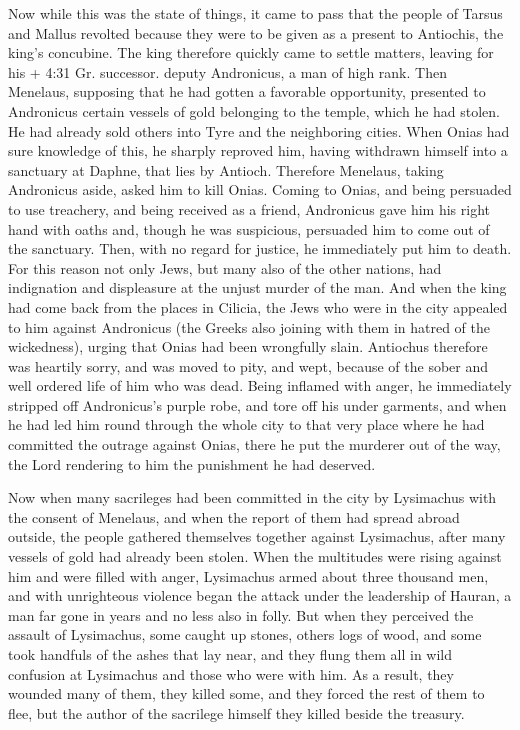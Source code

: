  Now while this was the state of things, it came to pass
that the people of Tarsus and Mallus revolted because they were to be
given as a present to Antiochis, the king's concubine.  The
king therefore quickly came to settle matters, leaving for his + 4:31
Gr. successor. deputy Andronicus, a man of high rank.  Then
Menelaus, supposing that he had gotten a favorable opportunity,
presented to Andronicus certain vessels of gold belonging to the temple,
which he had stolen. He had already sold others into Tyre and the
neighboring cities.  When Onias had sure knowledge of this,
he sharply reproved him, having withdrawn himself into a sanctuary at
Daphne, that lies by Antioch.  Therefore Menelaus, taking
Andronicus aside, asked him to kill Onias. Coming to Onias, and being
persuaded to use treachery, and being received as a friend, Andronicus
gave him his right hand with oaths and, though he was suspicious,
persuaded him to come out of the sanctuary. Then, with no regard for
justice, he immediately put him to death.  For this reason
not only Jews, but many also of the other nations, had indignation and
displeasure at the unjust murder of the man.  And when the
king had come back from the places in Cilicia, the Jews who were in the
city appealed to him against Andronicus (the Greeks also joining with
them in hatred of the wickedness), urging that Onias had been wrongfully
slain.  Antiochus therefore was heartily sorry, and was
moved to pity, and wept, because of the sober and well ordered life of
him who was dead.  Being inflamed with anger, he
immediately stripped off Andronicus's purple robe, and tore off his
under garments, and when he had led him round through the whole city to
that very place where he had committed the outrage against Onias, there
he put the murderer out of the way, the Lord rendering to him the
punishment he had deserved.

 Now when many sacrileges had been committed in the city by
Lysimachus with the consent of Menelaus, and when the report of them had
spread abroad outside, the people gathered themselves together against
Lysimachus, after many vessels of gold had already been stolen.
 When the multitudes were rising against him and were
filled with anger, Lysimachus armed about three thousand men, and with
unrighteous violence began the attack under the leadership of Hauran, a
man far gone in years and no less also in folly.  But when
they perceived the assault of Lysimachus, some caught up stones, others
logs of wood, and some took handfuls of the ashes that lay near, and
they flung them all in wild confusion at Lysimachus and those who were
with him.  As a result, they wounded many of them, they
killed some, and they forced the rest of them to flee, but the author of
the sacrilege himself they killed beside the treasury.

